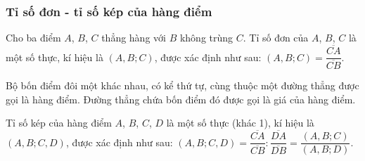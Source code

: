     \subsubsection*{Tỉ số đơn - tỉ số kép của hàng điểm}

        \begin{definition}
            Cho ba điểm \(A\), \(B\), \(C\) thẳng hàng với \(B\) không trùng \(C\). Tỉ số đơn của \(A\), \(B\), \(C\) là một số thực, kí hiệu là \((A,B;C)\), được xác định như sau: \((A,B;C) = \dfrac{\overline{CA}}{\overline{CB}}\). 
        \end{definition}

        \begin{definition}
            Bộ bốn điểm đôi một khác nhau, có kể thứ tự, cùng thuộc một đường thẳng được gọi là hàng điểm. Đường thẳng chứa bốn điểm đó được gọi là giá của hàng điểm.
        \end{definition}

        \begin{definition}
            Tỉ số kép của hàng điểm \(A\), \(B\), \(C\), \(D\) là một số thực (khác 1), kí hiệu là \((A,B;C,D)\), được xác định như sau: \((A,B;C,D) = \dfrac{\overline{CA}}{\overline{CB}} : \dfrac{\overline{DA}}{\overline{DB}} = \dfrac{(A,B;C)}{(A,B;D)}\).
        \end{definition}

        \begin{center}
        \end{center}

